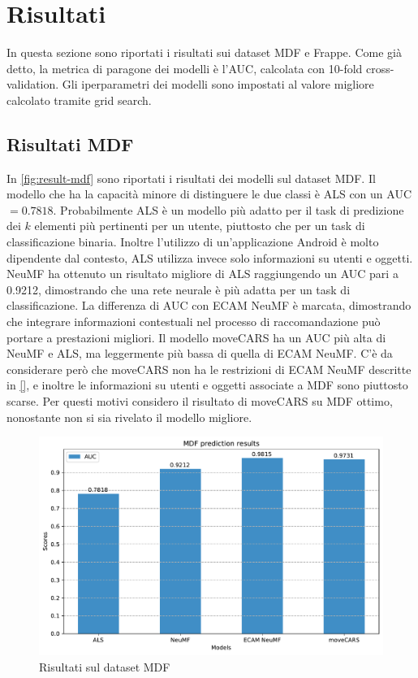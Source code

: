 \documentclass[12pt,italian]{report}
\begin{document}
\section{Risultati}
In questa sezione sono riportati i risultati sui dataset MDF e Frappe. Come già detto, la metrica di paragone dei modelli è l'AUC, calcolata con 10-fold cross-validation. Gli iperparametri dei modelli sono impostati al valore migliore calcolato tramite grid search.
\subsection{Risultati MDF}
In \autoref{fig:result-mdf} sono riportati i risultati dei modelli sul dataset MDF. Il modello che ha la capacità minore di distinguere le due classi è ALS con un AUC $= 0.7818$. Probabilmente ALS è un modello più adatto per il task di predizione dei $k$ elementi più pertinenti per un utente, piuttosto che per un task di classificazione binaria. Inoltre l'utilizzo di un'applicazione Android è molto dipendente dal contesto, ALS utilizza invece solo informazioni su utenti e oggetti. NeuMF ha ottenuto un risultato migliore di ALS raggiungendo un AUC pari a 0.9212, dimostrando che una rete neurale è più adatta per un task di classificazione. La differenza di AUC con ECAM NeuMF è marcata, dimostrando che integrare informazioni contestuali nel processo di raccomandazione può portare a prestazioni migliori. Il modello moveCARS ha un AUC più alta di NeuMF e ALS, ma leggermente più bassa di quella di ECAM NeuMF. C'è da considerare però che moveCARS non ha le restrizioni di ECAM NeuMF descritte in \autoref{}, e inoltre le informazioni su utenti e oggetti associate a MDF sono piuttosto scarse. Per questi motivi considero il risultato di moveCARS su MDF ottimo, nonostante non si sia rivelato il modello migliore.

\begin{figure}
  \centering
  \includegraphics[width=\linewidth]{immagini/mdf_test_results.pdf}
  \caption{Risultati sul dataset MDF}
  \label{fig:result-mdf}
\end{figure}
\end{document}
